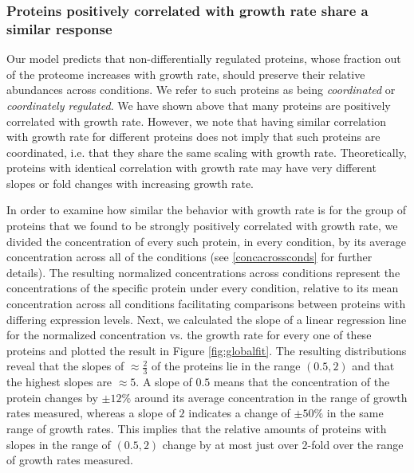 \documentclass[a4paper]{article}
\begin{document}
\subsubsection{Proteins positively correlated with growth rate share a similar response}
\label{propchange} 
Our model predicts that non-differentially regulated proteins, whose fraction out of the proteome increases with growth rate, should preserve their relative abundances across conditions.
We refer to such proteins as being \emph{coordinated} or \emph{coordinately regulated}.
We have shown above that many proteins are positively correlated with growth rate.
However, we note that having similar correlation with growth rate for different proteins does not imply that such proteins are coordinated, i.e. that they share the same scaling with growth rate.
Theoretically, proteins with identical correlation with growth rate may have very different slopes or fold changes with increasing growth rate.


In order to examine how similar the behavior with growth rate is for the group of proteins that we found to be strongly positively correlated with growth rate, we divided the concentration of every such protein, in every condition, by its average concentration across all of the conditions (see \ref{concacrossconds} for further details).
The resulting normalized concentrations across conditions represent the concentrations of the specific protein under every condition, relative to its mean concentration across all conditions facilitating comparisons between proteins with differing expression levels.
Next, we calculated the slope of a linear regression line for the normalized concentration vs. the growth rate for every one of these proteins and plotted the result in Figure \ref{fig:globalfit}.
The resulting distributions reveal that the slopes of $\approx \frac{2}{3}$ of the proteins lie in the range $(0.5,2)$ and that the highest slopes are $\approx 5$.
A slope of $0.5$ means that the concentration of the protein changes by $\pm12\%$ around its average concentration in the range of growth rates measured, whereas a slope of $2$ indicates a change of $\pm50\%$ in the same range of growth rates.
This implies that the relative amounts of proteins with slopes in the range of $(0.5,2)$ change by at most just over 2-fold over the range of growth rates measured.
\end{document}
